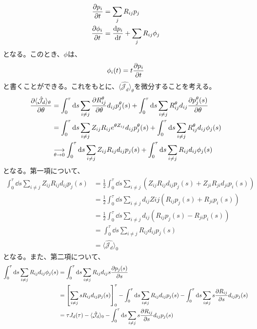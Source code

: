 \documentclass[a4paper,11pt]{jsarticle}
\numberwithin{equation}{section}
\begin{document}
\begin{align}
    \pdv{p_{i}}{t} &= \sum_{j} R_{ij}p_{j}\\
    \pdv{\phi_{i}}{t} &= \dv{p_{i}}{t} + \sum_{j} R_{ij}\phi_{j}
\end{align}
となる。このとき、$\phi$は、
\begin{align}
    \phi_{i}(t) = t\pdv{p_{i}}{t} 
\end{align}
と書くことができる。これをもとに、$\langle \hat{\mathcal{J}_d} \rangle_\theta$を微分することを考える。
\begin{align}
    \pdv{\langle \hat{\mathcal{J}_d} \rangle_\theta}{\theta} &= \int_0^\tau \dd{s} \sum_{i \neq j} \pdv{R_{ij}^{\theta}}{\theta}d_{ij}p_j^{\theta}(s) + \int_0^\tau \dd{s} \sum_{i \neq j} R_{ij}^{\theta}d_{ij}\pdv{p_j^{\theta}(s)}{\theta}\\
    &= \int_0^\tau \dd{s} \sum_{i \neq j}Z_{ij} R_{ij}e^{\theta Z_{ij}}d_{ij}p_j^{\theta}(s) + \int_0^\tau \dd{s} \sum_{i \neq j} R_{ij}^{\theta}d_{ij}\phi_j(s)\\
    &\underset{\theta \to 0}{\longrightarrow} \int_0^\tau \dd{s} \sum_{i \neq j} Z_{ij}R_{ij}d_{ij}p_j(s) + \int_0^\tau \dd{s} \sum_{i \neq j} R_{ij}d_{ij}\phi_j(s)
\end{align}
となる。第一項について、
\begin{align}
    \int_0^\tau \dd{s} \sum_{i \neq j} Z_{ij}R_{ij}d_{ij}p_j(s) 
    &= \frac{1}{2} \int_0^\tau \dd{s} \sum_{i \neq j} (Z_{ij}R_{ij}d_{ij}p_j(s) + Z_{ji}R_{ji}d_{ji}p_i(s))\\
    &= \frac{1}{2} \int_0^\tau \dd{s} \sum_{i \neq j} d_{ij}Z{ij}(R_{ij}p_j(s) + R_{ji}p_i(s))\\
    &= \frac{1}{2} \int_0^\tau \dd{s} \sum_{i \neq j} d_{ij}(R_{ij}p_j(s) - R_{ji}p_i(s))\\
    &= \int_{0}^{\tau} \dd{s} \sum_{i \neq j} R_{ij}d_{ij}p_j(s)\\
    &= \langle \hat{\mathcal{J}_d} \rangle_0
\end{align}
となる。また、第二項について、
\begin{align}
    \int_0^\tau \dd{s} \sum_{i \neq j} R_{ij}d_{ij}\phi_j(s) 
    &= \int_0^\tau \dd{s} \sum_{i \neq j} R_{ij}d_{ij}s\pdv{p_j(s)}{s} \\
    &= \left[\sum_{i \neq j}sR_{ij}d_{ij}p_j(s)\right]_0^\tau - \int_{0}^{\tau} \dd{s} \sum_{i \neq j} R_{ij}d_{ij}p_j(s) - \int_{0}^{\tau} \dd{s} \sum_{i \neq j} s\pdv{R_{ij}}{s}d_{ij}p_j(s)\\
    &= \tau J_{d}(\tau)- \langle \hat{\mathcal{J}_d} \rangle_0 - \int_{0}^{\tau} \dd{s} \sum_{i \neq j} s\pdv{R_{ij}}{s}d_{ij}p_j(s)\\
\end{align}
\end{document}
